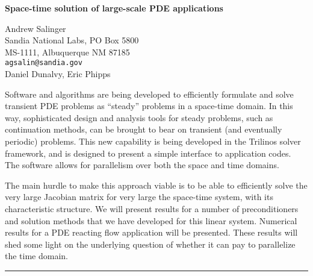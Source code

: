 \documentclass[twosided]{report}
\begin{document}
\begin{center}
{\large			%
{\bf Space-time solution of large-scale PDE applications}}

	Andrew Salinger \\
	Sandia National Labs, PO Box 5800 \\
	MS-1111, Albuquerque NM 87185 \\
	{\tt agsalin@sandia.gov} \\
	Daniel Dunalvy, Eric Phipps
\end{center}
Software and algorithms are being developed to efficiently
formulate and solve transient PDE problems as ``steady''
problems in a space-time domain. In this way, sophisticated
design and analysis tools for steady problems, such as
continuation methods, can be brought to bear on transient
(and eventually periodic) problems. This new capability is
being developed in the Trilinos solver framework, and is
designed to present a simple interface to application codes.
The software allows for parallelism over both the space and
time domains.

The main hurdle to make this approach
viable is to be able to efficiently solve the very large
Jacobian matrix for very large the space-time system, with
its characteristic structure. We will present results for a
number of preconditioners and solution methods that we have
developed for this linear system. Numerical results for a
PDE reacting flow application will be presented. These
results will shed some light on the underlying question of
whether it can pay to parallelize the time domain.



	\begin{center} \rule{6in}{1pt} \end{center}
\end{document}
